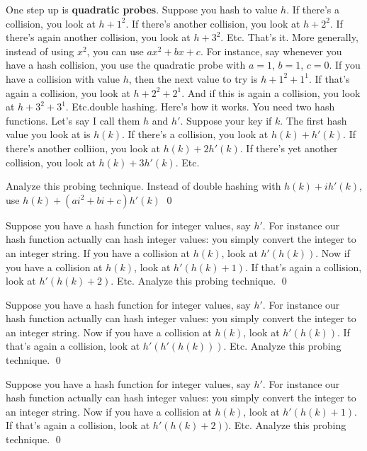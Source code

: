 One step up is \textbf{quadratic probes}.
Suppose you hash to value $h$.
If there's a collision, you look at $h + 1^2$.
If there's another collision, you look at $h + 2^2$.
If there's again another collision, you look at $h + 3^2$.
Etc.
That's it.
More generally, instead of using $x^2$, you can 
use $ax^2 + bx + c$.
For instance, say whenever you have a hash collision,
you use
the quadratic probe with $a = 1$, $b = 1$, $c = 0$.
If you have a collision with value $h$, then
the next value to try is 
$h + 1^2 + 1^1$.
If that's again a collision, you look at 
$h + 2^2 + 2^1$.
And if this is again a collision, you look at
$h + 3^2 + 3^1$.
Etc.{double hashing}.
Here's how it works.
You need two hash functions.
Let's say I call them $h$ and $h'$.
Suppose your key if $k$.
The first hash value you look at is $h(k)$.
If there's a collision, you look at 
$h(k) + h'(k)$.
If there's another colliion, you look at
$h(k) + 2h'(k)$.
If there's yet another collision, you look at
$h(k) + 3h'(k)$.
Etc.

\begin{ex}
Analyze this probing technique.
Instead of double hashing with $h(k) + ih'(k)$,
use $h(k) + (ai^2 + bi + c)h'(k)$
\qed
\end{ex}


\begin{ex}
Suppose you have a hash function for integer values, say $h'$.
For instance our hash function
actually can hash integer values: you simply convert the 
integer to an integer string. 
If you have a collision at $h(k)$, look at $h'(h(k))$.
Now if you have a collision at $h(k)$, look at $h'(h(k) + 1)$.
If that's again a collision, look at $h'(h(k) + 2)$.
Etc.
Analyze this probing technique.
\qed
\end{ex}

\begin{ex}
Suppose you have a hash function for integer values, say $h'$.
For instance our hash function
actually can hash integer values: you simply convert the 
integer to an integer string. 
Now if you have a collision at $h(k)$, look at $h'(h(k))$.
If that's again a collision, look at $h'(h'(h(k)))$.
Etc.
Analyze this probing technique.
\qed
\end{ex}

\begin{ex}
Suppose you have a hash function for integer values, say $h'$.
For instance our hash function
actually can hash integer values: you simply convert the 
integer to an integer string. 
Now if you have a collision at $h(k)$, look at $h'(h(k) + 1)$.
If that's again a collision, look at $h'(h(k) + 2))$.
Etc.
Analyze this probing technique.
\qed
\end{ex}

